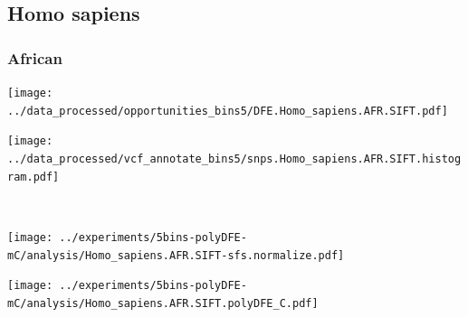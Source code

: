 \subsection{Homo sapiens}

\subsubsection{African}

\begin{minipage}{0.49\linewidth}
    \texttt{[image: ../data\_processed/opportunities\_bins5/DFE.Homo\_sapiens.AFR.SIFT.pdf]}
\end{minipage}
\begin{minipage}{0.49\linewidth}
    \texttt{[image: ../data\_processed/vcf\_annotate\_bins5/snps.Homo\_sapiens.AFR.SIFT.histogram.pdf]}
\end{minipage}
\\
\begin{minipage}{0.49\linewidth}
    \texttt{[image: ../experiments/5bins-polyDFE-mC/analysis/Homo\_sapiens.AFR.SIFT-sfs.normalize.pdf]}
\end{minipage}
\begin{minipage}{0.4\linewidth}
    \texttt{[image: ../experiments/5bins-polyDFE-mC/analysis/Homo\_sapiens.AFR.SIFT.polyDFE\_C.pdf]}
\end{minipage}
